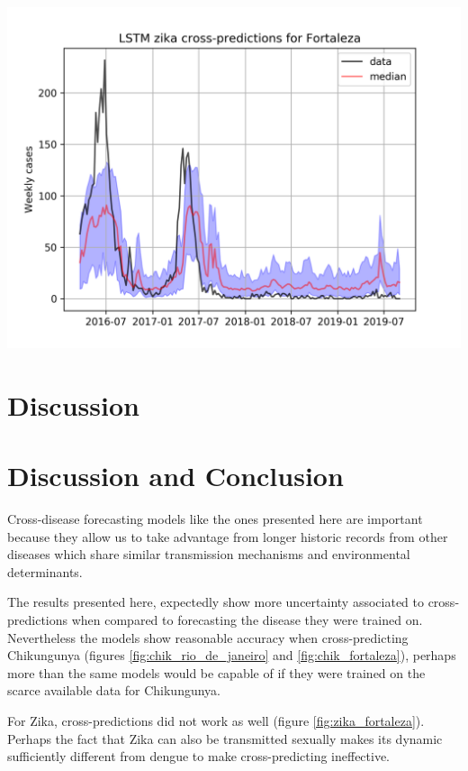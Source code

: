 \documentclass[a0,portrait]{a0poster}
\begin{document}
\begin{multicols}{3}
\begin{center}
\includegraphics[width=0.8\linewidth]{figures/lstm_zika_cross_Fortaleza.png} 
\label{fig:lstm_chik_fortaleza}
\end{center}%



\section*{Discussion}


\section*{Discussion and Conclusion}
Cross-disease forecasting models like the ones presented here are important 
because they allow us to take advantage from longer historic records from other 
diseases which share similar transmission mechanisms and environmental 
determinants.


The results presented here, expectedly show more uncertainty associated to 
cross-predictions when compared to forecasting the disease they were trained 
on. Nevertheless the models show reasonable accuracy when cross-predicting 
Chikungunya (figures \ref{fig:chik_rio_de_janeiro} and 
\ref{fig:chik_fortaleza}), perhaps more than the same models would be capable 
of 
if they were trained on the scarce available data for Chikungunya. 

For Zika, cross-predictions did not work as well (figure 
\ref{fig:zika_fortaleza}). Perhaps the fact that Zika can also be transmitted 
sexually\cite{coelho2016higher} makes its dynamic sufficiently different from 
dengue to make cross-predicting ineffective.


\end{multicols}
\end{document}
